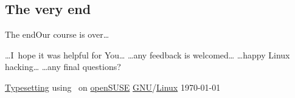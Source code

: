 \documentclass[compress, xelatex, 11pt, xcolor=svgnames, aspectratio=169, url={hyphens, lowtilde}]{beamer}
\begin{document}
\subsection{The very end}

\begin{frame}{The end}{Our course is over\ldots}
	\begin{center}
		\ldots I~hope it was helpful for You\ldots
		\vfill
		\ldots any feedback is welcomed\ldots
		\vfill
		\ldots happy Linux hacking\ldots
		\vfill
		\ldots any final questions?
		\vfill
	\end{center}
	\begin{flushright}
		\begin{tiny}
		\href{https://en.wikipedia.org/wiki/XeTeX}{Typesetting} using \XeLaTeX~on \href{https://www.opensuse.org/}{openSUSE} \href{https://en.wikipedia.org/wiki/GNU}{GNU}/\href{https://en.wikipedia.org/wiki/Linux}{Linux} \today
		\end{tiny}
	\end{flushright}
\end{frame}
\end{document}
